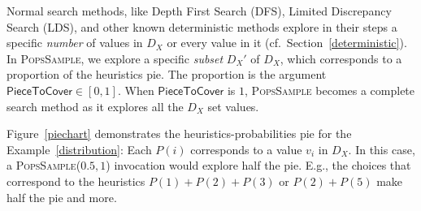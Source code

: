 \documentclass{ws-ijait}
\begin{document}
Normal search methods, like Depth First Search (DFS),
Limited Discrepancy Search (LDS), and other known
deterministic methods explore in their steps a specific
\emph{number} of values in $D_X$ or every value in it (cf.\ 
Section~\ref{deterministic}). In \textsc{PopsSample}, we
explore a specific \emph{subset} $D_X'$ of $D_X$, which
corresponds to a proportion of the heuristics pie. The
proportion is the argument $\mathsf{PieceToCover} \in
[0,1]$. When $\mathsf{PieceToCover}$ is $1$,
\textsc{PopsSample} becomes a complete search method as it
explores all the $D_X$ set values.
\begin{example}
  \label{heuristics-pie}
  Figure~\ref{piechart} demonstrates the
  heuristics-probabilities pie for the
  Example~\ref{distribution}: Each $P(i)$ corresponds to a
  value $v_i$ in $D_X$. In this case, a
  \textsc{PopsSample}($0.5, 1$) invocation would explore
  half the pie. E.g., the choices that correspond to the
  heuristics $P(1) + P(2) + P(3)$ or $P(2) + P(5)$ make half
  the pie and more.


\end{example}
\end{document}
